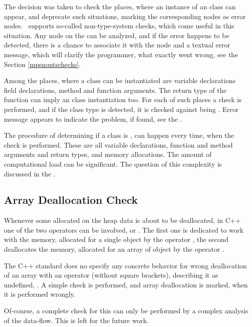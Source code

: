 The decision was taken to check the places, where an instance of an  class can appear, and deprecate such situations, marking the 
corresponding nodes as error nodes.
\jbmps\ supports so-called non-type-system checks, which come useful in this situation. Any node on the  can be analyzed, and 
if the error happens to be detected, there is a chance to associate it with the node and a textual error message, which will
clarify the programmer, what exactly went wrong, see the Section \ref{mpsnontschecks}.

Among the places, where a class can be instantiated are variable declarations field declarations, method and function arguments.
The return type of the function can imply an  class instantiation too. For each of such places a check is performed, 
and if the class type is detected, it is checked against being . Error message appears to indicate the problem, 
if found, see the . 

The procedure of determining if a class is , can happen every time, when the check is performed. These are all 
variable declarations, function and method arguments and return types, and memory allocations. The amount of computational
load can be significant. The question of this complexity is discussed in the .


\subsection{Array Deallocation Check}
Whenever some allocated on the heap data is about to be deallocated, in C++ one of the two operators can
be involved,  or . The first one is dedicated to work with the memory, allocated
for a single object by the operator , the second deallocates the memory, allocated for an array
of object by the operator .

The C++ standard does no specify any concrete behavior for wrong deallocation of an array with 
an operator  (without square brackets), describing it as undefined, \cite{cpp11}.
A simple check is performed, and array deallocation is marked, when it is performed wrongly. 

Of-course, a complete check for this can only be performed by a complex analysis of the data-flow.
This is left for the future work.


